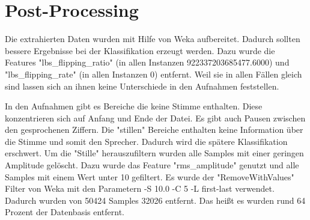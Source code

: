 \section{Post-Processing}
Die extrahierten Daten wurden mit Hilfe von Weka aufbereitet. Dadurch sollten bessere Ergebnisse bei der Klassifikation erzeugt werden. Dazu wurde die Features "lbs_flipping_ratio" (in allen Instanzen 922337203685477.6000) und "lbs_flipping_rate" (in allen Instanzen 0) entfernt. Weil sie in allen Fällen gleich sind lassen sich an ihnen keine Unterschiede in den Aufnahmen feststellen.

In den Aufnahmen gibt es Bereiche die keine Stimme enthalten. Diese konzentrieren sich auf Anfang und Ende der Datei. Es gibt auch Pausen zwischen den gesprochenen Ziffern. Die "stillen" Bereiche enthalten keine Information über die Stimme und somit den Sprecher. Dadurch wird die spätere Klassifikation erschwert. Um die "Stille" herauszufiltern wurden alle Samples mit einer geringen Amplitude gelöscht. Dazu wurde das Feature "rms_amplitude" genutzt und alle Samples mit einem Wert unter 10 gefiltert. Es wurde der "RemoveWithValues" Filter von Weka mit den Parametern -S 10.0 -C 5 -L first-last verwendet. Dadurch wurden von 50424 Samples 32026 entfernt. Das heißt es wurden rund 64 Prozent der Datenbasis entfernt.

